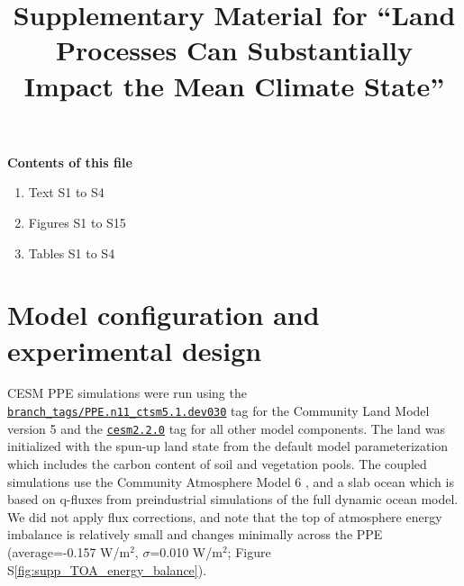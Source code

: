 \documentclass[draft, grl]{agujournal2019}
\begin{document}

\title{Supplementary Material for ``Land Processes Can Substantially Impact the Mean Climate State''
}




\noindent\textbf{Contents of this file}
\begin{enumerate}
\item Text S1 to S4
\item Figures S1 to S15
\item Tables S1 to S4
\end{enumerate}
\clearpage{}

\renewcommand{\thesection}{Text S\arabic{section}}

\section{Model configuration and experimental design}
\label{Text:model_configuration}
CESM PPE simulations were run using the \href{https://github.com/ESCOMP/CTSM/releases/tag/branch_tags\%2FPPE.n11_ctsm5.1.dev030}{\texttt{branch_tags/PPE.n11_ctsm5.1.dev030}} tag for the Community Land Model version 5 \citep[CLM5;][]{lawrence_community_2019} and the \href{https://github.com/ESCOMP/CESM/releases/tag/cesm2.2.0}{\texttt{cesm2.2.0}} tag for all other model components. The land was initialized with the spun-up land state from the default model parameterization which includes the carbon content of soil and vegetation pools. The coupled simulations use the Community Atmosphere Model 6 \citep[CAM6;][]{bogenschutz_path_2018}, and a slab ocean \citep{danabasoglu_equilibrium_2009} which is based on q-fluxes from preindustrial simulations of the full dynamic ocean model. We did not apply flux corrections, and note that the top of atmosphere energy imbalance is relatively small and changes minimally across the PPE (average=-0.157 W/m$^2$, $\sigma$=0.010 W/m$^2$; Figure S\ref{fig:supp_TOA_energy_balance}).
\end{document}
